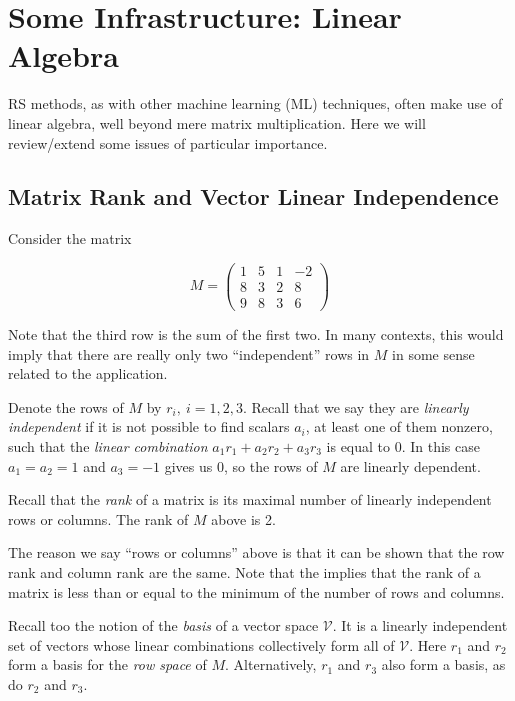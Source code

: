 \chapter{Some Infrastructure: Linear Algebra}  
\label{chap:linalg}   

RS methods, as with other machine learning (ML) techniques, often make
use of linear algebra, well beyond mere matrix multiplication.  Here we
will review/extend some issues of particular importance.

\section{Matrix Rank and Vector Linear Independence}

Consider the matrix

\begin{equation}
\label{rankex1}
M = 
\left (
\begin{array}{rrrr}
1 & 5 & 1 & -2 \\
8 & 3 & 2 & 8 \\
9 & 8 & 3 & 6 
\end{array}
\right )
\end{equation}

Note that the third row is the sum of the first two.  In many contexts,
this would imply that there are really only two ``independent'' rows in
$M$ in some sense related to the application.  

Denote the rows of $M$ by $r_i, ~ i = 1,2,3$.  Recall that we say they
are \textit{linearly independent} if it is not possible to find scalars
$a_i$, at least one of them nonzero, such that the \textit{linear
combination} $a_1 r_1 + a_2 r_2 + a_3 r_3$ is equal to 0.  In this case
$a_1 = a_2 = 1$ and $a_3 = -1$ gives us 0, so the rows of $M$ are
linearly dependent.

Recall that the \textit{rank} of a matrix is its maximal number of
linearly independent rows or columns.  The rank of $M$ above is 2.

The reason we say ``rows or columns'' above is that it can be shown that
the row rank and column rank are the same.  Note that the implies that
the rank of a matrix is less than or equal to the minimum of the number
of rows and columns.

Recall too the notion of the \textit{basis} of a vector space
$\mathcal{V}$.  It is a linearly independent set of vectors whose linear
combinations collectively form all of $\mathcal{V}$.  Here  $r_1$ and
$r_2$ form a basis for the \textit{row space} of $M$.  Alternatively,
$r_1$ and $r_3$ also form a basis, as do $r_2$ and $r_3$.

